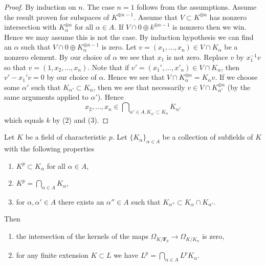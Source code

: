\begin{proof}
By induction on $n$. The case $n = 1$ follows from the assumptions.
Assume the result proven for subspaces of $K^{\oplus n - 1}$.
Assume that $V \subset K^{\oplus n}$ has nonzero intersection with
$K_\alpha^{\oplus n}$ for all $\alpha \in A$. If
$V \cap 0 \oplus k^{\oplus n - 1}$ is nonzero then we win. Hence we may
assume this is not the case. By induction hypothesis we can find
an $\alpha$ such that $V \cap 0 \oplus K_\alpha^{\oplus n - 1}$
is zero. Let $v = (x_1, \ldots, x_n) \in V \cap K_\alpha$ be a nonzero element.
By our choice of $\alpha$ we see that $x_1$ is not zero.
Replace $v$ by $x_1^{-1}v$ so that $v = (1, x_2, \ldots, x_n)$.
Note that if $v' = (x_1', \ldots, x'_n) \in V \cap K_\alpha$, then
$v' - x_1'v = 0$ by our choice of $\alpha$. Hence we see that
$V \cap K_\alpha^{\oplus n} = K_\alpha v$. If we choose some
$\alpha'$ such that $K_{\alpha'} \subset K_\alpha$, then we
see that necessarily $v \in V \cap K_{\alpha'}^{\oplus n}$ (by the
same arguments applied to $\alpha'$). Hence
$$
x_2, \ldots, x_n \in
\bigcap\nolimits_{\alpha' \in A, K_{\alpha'} \subset K_\alpha} K_{\alpha'}
$$
which equals $k$ by (2) and (3).
\end{proof}

\begin{lemma}
\label{lemma-intersection-subfields}
Let $K$ be a field of characteristic $p$. Let $\{K_\alpha\}_{\alpha \in A}$
be a collection of subfields of $K$ with the following properties
\begin{enumerate}
\item $K^p \subset K_\alpha$ for all $\alpha \in A$,
\item $K^p = \bigcap_{\alpha \in A} K_\alpha$,
\item for $\alpha, \alpha' \in A$ there exists an $\alpha'' \in A$
such that $K_{\alpha''} \subset K_\alpha \cap K_{\alpha'}$.
\end{enumerate}
Then
\begin{enumerate}
\item the intersection of the kernels of the maps
$\Omega_{K/\mathbf{F}_p} \to \Omega_{K/K_\alpha}$ is zero,
\item for any finite extension $K \subset L$ we have
$L^p = \bigcap_{\alpha \in A} L^pK_\alpha$.
\end{enumerate}
\end{lemma}

